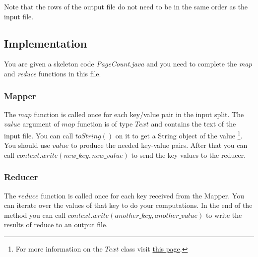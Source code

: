 \documentclass[11pt]{article}
\begin{document}
\noindent Note that the rows of the output file do not need to be in the same order as the input file.

\subsection*{Implementation}
You are given a skeleton code \textit{PageCount.java} and you need to complete the \textit{map} and \textit{reduce} functions in this file.

\subsubsection*{Mapper}
The $map$ function is called once for each key/value pair in the input split. The $value$ argument of $map$ function is of type $Text$ and contains the text of the input file. You can call $toString()$ on it to get a String object of the value \footnote{For more information on the $Text$ class visit  \href{https://hadoop.apache.org/docs/r2.7.3/api/org/apache/hadoop/io/Text.html}{this page}.}. You should use $value$ to produce the needed key-value pairs. After that you can call $context.write(new\_key, new\_value)$ to send the key values to the reducer. 

\subsubsection*{Reducer}
The $reduce$ function is called once for each key received from the Mapper. You can iterate over the values of that key to do your computations. In the end of the method you can call $context.write(another\_key, another\_value)$ to write the results of reduce to an output file.
\end{document}
